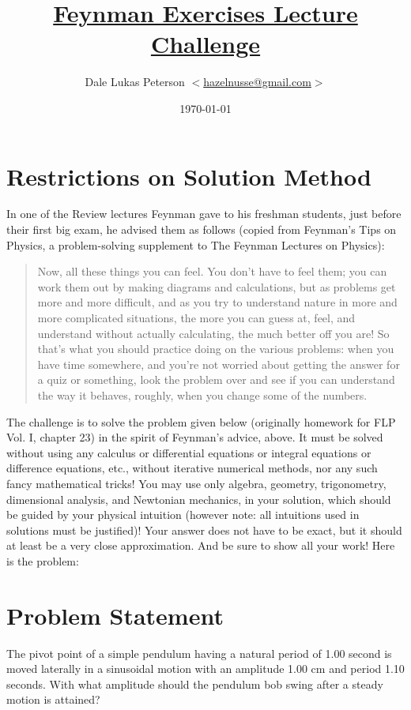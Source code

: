 \documentclass[letter, 11pt]{article}
\author{Dale Lukas Peterson
\href{mailto:hazelnusse@gmail.com}{$<$hazelnusse@gmail.com$>$}}
\title{\href{http://feynmanlectures.info/announcement.html}{Feynman Exercises
Lecture Challenge}}
\date{\today}
\begin{document}
\pagestyle{empty}
\maketitle

\section*{Restrictions on Solution Method}
In one of the Review lectures Feynman gave to his freshman students, just
before their first big exam, he advised them as follows (copied from Feynman's
Tips on Physics, a problem-solving supplement to The Feynman Lectures on
Physics):

\begin{quote}
  Now, all these things you can feel. You don't have to feel them; you can work
  them out by making diagrams and calculations, but as problems get more and
  more difficult, and as you try to understand nature in more and more
  complicated situations, the more you can guess at, feel, and understand
  without actually calculating, the much better off you are! So that's what you
  should practice doing on the various problems: when you have time somewhere,
  and you're not worried about getting the answer for a quiz or something, look
  the problem over and see if you can understand the way it behaves, roughly,
  when you change some of the numbers.
\end{quote}

The challenge is to solve the problem given below (originally homework for FLP
Vol. I, chapter 23) in the spirit of Feynman's advice, above. It must be solved
without using any calculus or differential equations or integral equations or
difference equations, etc., without iterative numerical methods, nor any such
fancy mathematical tricks! You may use only algebra, geometry, trigonometry,
dimensional analysis, and Newtonian mechanics, in your solution, which should
be guided by your physical intuition (however note: all intuitions used in
solutions must be justified)! Your answer does not have to be exact, but it
should at least be a very close approximation. And be sure to show all your
work! Here is the problem:

\section*{Problem Statement}
The pivot point of a simple pendulum having a natural period of 1.00 second is
moved laterally in a sinusoidal motion with an amplitude 1.00 cm and period
1.10 seconds. With what amplitude should the pendulum bob swing after a steady
motion is attained?
\end{document}
